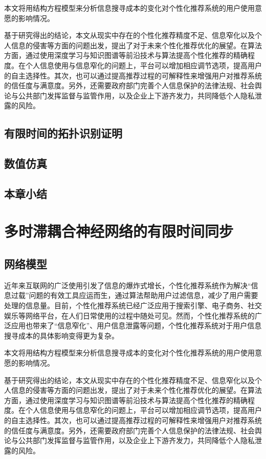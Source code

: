 \documentclass[a4paper,zihao=-4,UTF8]{ctexart}
\numberwithin{equation}{section}
\begin{document}
	本文将用结构方程模型来分析信息搜寻成本的变化对个性化推荐系统的用户使用意愿的影响情况。
	
	基于研究得出的结论，本文从现实中存在的个性化推荐精度不足、信息窄化以及个人信息的侵害等方面的问题出发，提出了对于未来个性化推荐优化的展望。在算法方面，通过使用深度学习与知识图谱等前沿技术与算法提高个性化推荐的精确程度。在个人信息使用与信息窄化的问题上，平台可以增加相应调节选项，提高用户的自主选择性。其次，也可以通过提高推荐过程的可解释性来增强用户对推荐系统的信任度与满意度。另外，还需要政府部门完善个人信息保护的法律法规、社会舆论与公共部门发挥监督与监管作用，以及企业上下游齐发力，共同降低个人隐私泄露的风险。
	\subsection{有限时间的拓扑识别证明}
	\subsection{数值仿真}
	\subsection{本章小结}

\newpage
\section{多时滞耦合神经网络的有限时间同步}
	\subsection{网络模型}
	近年来互联网的广泛使用引发了信息的爆炸式增长，个性化推荐系统作为解决“信息过载”问题的有效工具应运而生，通过算法帮助用户过滤信息，减少了用户需要处理的信息量。目前，个性化推荐系统已经广泛应用于搜索引擎、电子商务、社交娱乐等网络平台，在人们日常使用的过程中随处可见。然而，个性化推荐系统的广泛应用也带来了“信息窄化”、用户信息泄露等问题，个性化推荐系统对于用户信息搜寻成本的具体影响变得更为复杂。
	
	本文将用结构方程模型来分析信息搜寻成本的变化对个性化推荐系统的用户使用意愿的影响情况。
	
	基于研究得出的结论，本文从现实中存在的个性化推荐精度不足、信息窄化以及个人信息的侵害等方面的问题出发，提出了对于未来个性化推荐优化的展望。在算法方面，通过使用深度学习与知识图谱等前沿技术与算法提高个性化推荐的精确程度。在个人信息使用与信息窄化的问题上，平台可以增加相应调节选项，提高用户的自主选择性。其次，也可以通过提高推荐过程的可解释性来增强用户对推荐系统的信任度与满意度。另外，还需要政府部门完善个人信息保护的法律法规、社会舆论与公共部门发挥监督与监管作用，以及企业上下游齐发力，共同降低个人隐私泄露的风险。
\end{document}
